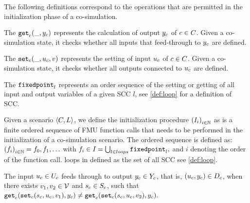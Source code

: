 The following definitions correspond to the operations that are permitted in the initialization phase of a co-simulation.

\begin{definition}\label{def:getout}
The $\mathtt{get}_{c}(\_, y_{c})$ represents the calculation of output $y_{c}$ of $c \in C$. Given a co-simulation state, it checks whether all inputs that feed-through to $y_{c}$ are defined.
\end{definition}

\begin{definition}\label{def:setin}
The $\mathtt{set}_{c}(\_, u_{c}, v)$ represents the setting of input $u_{c}$  of $c \in C$. Given a co-simulation state, it checks whether all outputs connected to $u_{c}$ are defined.
\end{definition}

\begin{definition}\label{def:fixedpoint}
The $\mathtt{fixedpoint}_{l}$ represents an order sequence of the setting or getting of all input and output variables of a given SCC $l$, see \cref{def:loop} for a definition of SCC.
\end{definition}

\begin{definition}[Initialization]\label{def:initialization}
  Given a scenario $ \left\langle C, L \right\rangle $, we define the initialization procedure $ \left( I_i \right)_{i \in \mathbb{N}}$ as is a finite ordered sequence of FMU function calls that needs to be performed in the initialization of a co-simulation scenario. The ordered sequence is defined as: $ \left( f_i \right)_{i \in \mathbb{N}} = f_0, f_1, \ldots$ with
  $f_i \in I_{} = \bigcup_{l \in loops} \mathtt{fixedpoint}_{l},$
  and $i$ denoting the order of the function call.
  loops in defined as the set of all SCC see \cref{def:loop}.
\end{definition}

\begin{definition}\label{def:feedthrough}
  The input $u_{c} \in U_{c}$ feeds through to output $y_{c} \in Y_{c}$, that is, $(u_{c},y_{c}) \in D_{c}$, when there exists $v_1, v_2 \in \mathcal{V}$ and $s_{c} \in S_{c}$, such that
  $
  \mathtt{get}_{c} (\mathtt{set}_{c}(s_{c}, u_{c}, v_1), y_{c}) \neq \mathtt{get}_{c} (\mathtt{set}_{c}(s_{c}, u_{c}, v_2), y_{c}).
  $
\end{definition}


